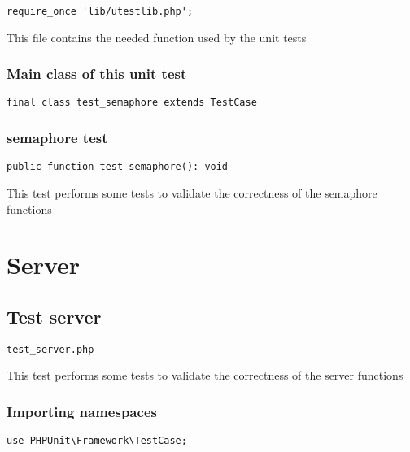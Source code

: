 \documentclass[a4paper]{article}
\begin{document}
\begin{lstlisting}
require_once 'lib/utestlib.php';
\end{lstlisting}

This file contains the needed function used by the unit tests

\hypertarget{toc359}{}
\subsubsection{Main class of this unit test}

\begin{lstlisting}
final class test_semaphore extends TestCase
\end{lstlisting}

\hypertarget{toc360}{}
\subsubsection{semaphore test}

\begin{lstlisting}
public function test_semaphore(): void
\end{lstlisting}

This test performs some tests to validate the correctness
of the semaphore functions


\hypertarget{toc361}{}
\section{Server}

\hypertarget{toc362}{}
\subsection{Test server}

\begin{lstlisting}
test_server.php
\end{lstlisting}

This test performs some tests to validate the correctness
of the server functions

\hypertarget{toc363}{}
\subsubsection{Importing namespaces}

\begin{lstlisting}
use PHPUnit\Framework\TestCase;
\end{lstlisting}

\hypertarget{toc364}{}
\end{document}
